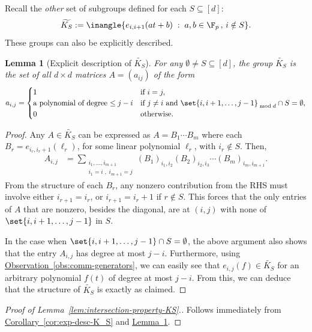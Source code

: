 \documentclass[11pt]{article}
\newcommand{\expref}[2]{\texorpdfstring{\hyperref[#2]{#1~\ref{#2}}}{#1~\ref{#2}}}
\newtheorem{lemma}[theorem]{Lemma}
\begin{document}
\noindent
Recall the \emph{other} set of subgroups defined for each $S \subseteq [d]$:
\[
  \widetilde{K_S} := \inangle{e_{i,i+1}(at+b)\;:\; a,b\in \F_p\,,\, i\notin S}.
\]
These groups can also be explicitly described.

\begin{lemma}[Explicit description of $\widetilde{K_S}$]\label{lem:exp-desc-K_S-tilde} For any $\emptyset \neq S \subseteq [d]$, the group  $\widetilde{K_S}$ is the set of all $d\times d$ matrices $A = (a_{ij})$ of the form
  \[
    a_{i,j} = \begin{cases}
      1 & \text{if }i = j,\\
      \text{a polynomial of degree $\leq j-i$} & \text{if }j\neq i \text{ and }\set{i,i+1,\ldots,j-1}_{\bmod{d}} \cap S = \emptyset,\\
      0 & \text{otherwise}.
    \end{cases}
  \]
\end{lemma}
\begin{proof}
Any $A\in \widetilde{K_S}$ can be expressed as  $A = B_1\cdots B_m$ where each $B_r = e_{i_{r},i_{r}+1}(\ell_r)$, for some linear polynomial $\ell_r$, with $i_r \notin S$.
Then,
\begin{align*}
  A_{i,j} & = \sum_{\substack{i_1,\ldots, i_{m+1}\\i_1 = i\;,\;i_{m+1} = j}} (B_1)_{i_1,i_2} (B_2)_{i_2,i_3} \cdots (B_m)_{i_m,i_{m+1}}. 
\end{align*}
From the structure of each $B_r$, any nonzero contribution from the RHS must involve either $i_{r+1} = i_{r}$, or $i_{r+1} = i_r + 1$ if $r \notin S$. This forces that the only entries of $A$ that are nonzero, besides the diagonal, are at $(i,j)$ with none of $\set{i,i+1,\ldots, j-1}$ in $S$.

In the case when $\set{i,i+1,\ldots, j-1} \cap S = \emptyset$, the above
argument also shows that the entry $A_{i,j}$ has degree at most $j-i$. Furthermore, using
\expref{Observation}{obs:comm-generators}, we can easily see that $e_{i,j}(f) \in \widetilde{K_S}$ for an arbitrary polynomial $f(t)$ of degree at most $j-i$. From this, we can deduce that the structure of $\widetilde{K_S}$ is exactly as claimed. 
\end{proof}

\begin{proof}[Proof of Lemma~\ref{lem:intersection-property-KS}.]
Follows immediately from \expref{Corollary}{cor:exp-desc-K_S} and \expref{Lemma}{lem:exp-desc-K_S-tilde}. 
\end{proof}
\end{document}
